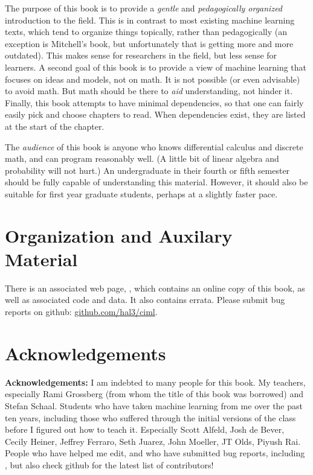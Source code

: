 The purpose of this book is to provide a \emph{gentle} and
\emph{pedagogically organized} introduction to the field.  This is in
contrast to most existing machine learning texts, which tend to
organize things topically, rather than pedagogically (an exception is
Mitchell's book, but unfortunately that is
getting more and more outdated).  This makes sense for researchers in
the field, but less sense for learners.  A second goal of this book is
to provide a view of machine learning that focuses on ideas and
models, not on math.  It is not possible (or even advisable) to avoid
math.  But math should be there to \emph{aid} understanding, not
hinder it.  Finally, this book attempts to have minimal dependencies,
so that one can fairly easily pick and choose chapters to read.  When
dependencies exist, they are listed at the start of the chapter.

The \emph{audience} of this book is anyone who knows differential
calculus and discrete math, and can program reasonably well.  (A
little bit of linear algebra and probability will not hurt.)  An
undergraduate in their fourth or fifth semester should be fully
capable of understanding this material.  However, it should also be
suitable for first year graduate students, perhaps at a slightly
faster pace.

\section{Organization and Auxilary Material}

There is an associated web page, \bookurl, which contains an online
copy of this book, as well as associated code and data.  It also
contains errata. Please submit bug reports on github: \url{github.com/hal3/ciml}.

\section{Acknowledgements}

{\bf Acknowledgements:} I am indebted to many people for this book.
My teachers, especially Rami Grossberg (from whom the title of this
book was borrowed) and Stefan Schaal.  Students who have taken machine
learning from me over the past ten years, including those who suffered
through the initial versions of the class before I figured out how to
teach it.  Especially Scott Alfeld, Josh de Bever, Cecily Heiner,
Jeffrey Ferraro, Seth Juarez, John Moeller, JT Olds, Piyush Rai.
People who have helped me edit, and who have submitted bug reports,
including \TODO, but also check github for the latest list of
contributors!

